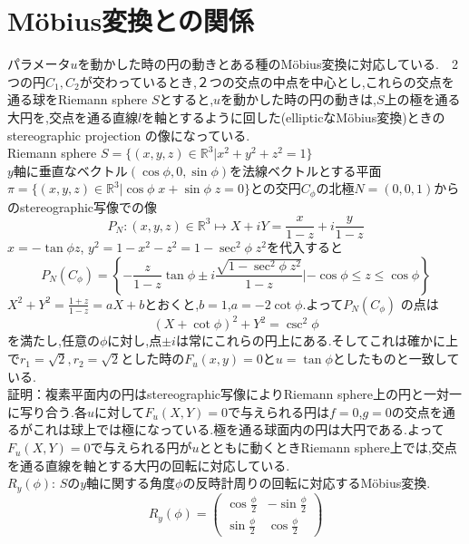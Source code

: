 \documentclass[a4j,12pt]{jarticle}
\numberwithin{equation}{section}
\begin{document}
\section{M\"obius変換との関係}
パラメータ$u$を動かした時の円の動きとある種のM\"obius変換に対応している.　2つの円$C_1,C_2$が交わっているとき,２つの交点の中点を中心とし,これらの交点を通る球をRiemann sphere $S$とすると,$u$を動かした時の円の動きは,$S$上の極を通る大円を,交点を通る直線$l$を軸とするように回した(ellipticなM\"obius変換)ときのstereographic projection の像になっている.\\
Riemann sphere $S=\{(x,y,z)\in \mathbb{R}^3| x^2 +y^2+z^2 = 1\}$\\
$y$軸に垂直なベクトル$(\cos{\phi},0,\sin{\phi})$を法線ベクトルとする平面$\pi = \{(x,y,z)\in \mathbb{R}^3|\cos{\phi}\;x+\sin{\phi}\;z=0\}$との交円$C_{\phi}$の北極$N=(0,0,1)$からのstereographic写像での像\\
\begin{equation}
\label{}
P_{N}:(x,y,z)\in \mathbb{R}^3 \mapsto X+iY = \frac{x}{1-z} + i\frac{y}{1-z}
\end{equation}
$x=-\tan{\phi}z$, $y^2=1-x^2-z^2 = 1-\sec^2{\phi}\;z^2$を代入すると
\begin{equation}
\label{}
P_{N}(C_{\phi}) = \left\{-\frac{z}{1-z} \tan{\phi} \pm i\frac{\sqrt{1-\sec^2{\phi}\;z^2}}{1-z}|-\cos{\phi}\le z \le \cos{\phi}\right\}
\end{equation}
$X^2+Y^2=\frac{1+z}{1-z}=aX+b$とおくと,$b=1$,$a=-2\cot{\phi}$.よって$P_{N}(C_{\phi})$ の点は
\begin{equation}
\label{}
(X+\cot{\phi})^2 + Y^2 = \csc^2{\phi}
\end{equation}
を満たし,任意の$\phi$に対し,点$\pm i$は常にこれらの円上にある.そしてこれは確かに上で$r_1=\sqrt{2},r_2=\sqrt{2}$とした時の$F_u(x,y)=0$と$u=\tan{\phi}$としたものと一致している.\\
証明：複素平面内の円はstereographic写像によりRiemann sphere上の円と一対一に写り合う.各$u$に対して$F_u(X,Y)=0$で与えられる円は$f=0$,$g=0$の交点を通るがこれは球上では極になっている.極を通る球面内の円は大円である.よって$F_u(X,Y)=0$で与えられる円が$u$とともに動くときRiemann sphere上では,交点を通る直線を軸とする大円の回転に対応している.\\
$R_{y}(\phi)$: $S$の$y$軸に関する角度$\phi$の反時計周りの回転に対応するM\"obius変換.
\begin{equation}
\label{}
R_{y}(\phi) = \left(\begin{array}{cc}\cos{\frac{\phi}{2}} & -\sin{\frac{\phi}{2}} \\ \sin{\frac{\phi}{2}} & \cos{\frac{\phi}{2}}\end{array}\right)  
\end{equation}
\end{document}
